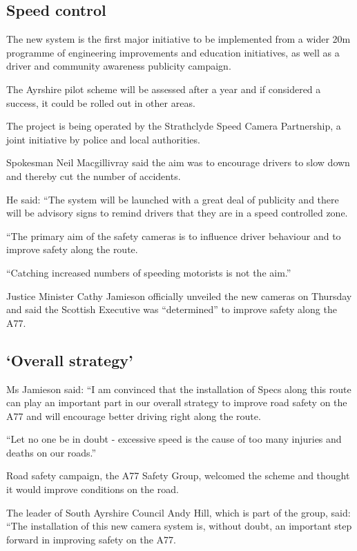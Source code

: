 \documentclass[11pt]{article}
\begin{document}
\subsection*{Speed control}

The new system is the first major initiative to be implemented from a
wider \textsterling 20m programme of engineering improvements and
education initiatives, as well as a driver and community awareness
publicity campaign.

The Ayrshire pilot scheme will be assessed after a year and if
considered a success, it could be rolled out in other areas.

The project is being operated by the Strathclyde Speed Camera
Partnership, a joint initiative by police and local authorities.

Spokesman Neil Macgillivray said the aim was to encourage drivers to
slow down and thereby cut the number of accidents.

He said: ``The system will be launched with a great deal of publicity
and there will be advisory signs to remind drivers that they are in a
speed controlled zone.

``The primary aim of the safety cameras is to influence driver
behaviour and to improve safety along the route.

``Catching increased numbers of speeding motorists is not the aim.''

Justice Minister Cathy Jamieson officially unveiled the new cameras on
Thursday and said the Scottish Executive was ``determined'' to improve
safety along the A77.

\subsection*{`Overall strategy'}

Ms Jamieson said: ``I am convinced that the installation of Specs along
this route can play an important part in our overall strategy to
improve road safety on the A77 and will encourage better driving right
along the route.

``Let no one be in doubt - excessive speed is the cause of too many
injuries and deaths on our roads.''

Road safety campaign, the A77 Safety Group, welcomed the scheme and
thought it would improve conditions on the road.

The leader of South Ayrshire Council Andy Hill, which is part of the
group, said: ``The installation of this new camera system is, without
doubt, an important step forward in improving safety on the A77.
\end{document}
